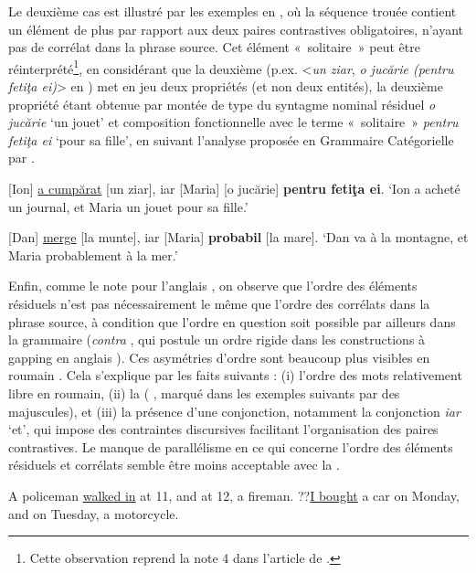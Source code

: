 Le deuxième cas est illustré par les exemples en , où la séquence trouée contient un élément de plus par rapport aux deux paires contrastives obligatoires, n’ayant pas de corrélat dans la phrase source. Cet élément «~solitaire~» peut être réinterprété\footnote{
 Cette observation reprend la note 4 dans l’article de \citet[186]{AbeilleEtAl2010}.}, en considérant que la deuxième  (p.ex. <\textit{un ziar}, \textit{o jucărie (pentru fetiţa ei)}> en ) met en jeu deux propriétés (et non deux entités), la deuxième propriété étant obtenue par montée de type du syntagme nominal résiduel \textit{o jucărie} ‘un jouet’ et composition fonctionnelle avec le terme «~solitaire~» \textit{pentru fetiţa ei} ‘pour sa fille’, en suivant l’analyse proposée en Grammaire Catégorielle par \citet{Steedman2000}. 

\ea \label{ch2:ex137}
\ea {} [Ion] \uline{a cumpărat} [un ziar], iar [Maria] [o jucărie] \textbf{pentru fetiţa ei}. \label{ch2:ex137a}
\glt  ‘Ion a acheté un journal, et Maria un jouet pour sa fille.’  

\ex {} [Dan] \uline{merge} [la munte], iar [Maria] \textbf{probabil} [la mare]. \label{ch2:ex137b} 
\glt  ‘Dan va à la montagne, et Maria probablement à la mer.’ 
\z
\z

Enfin, comme le note \citet{SagEtAl1985} pour l’anglais , on observe que l’ordre des éléments résiduels n’est pas nécessairement le même que l’ordre des corrélats dans la phrase source, à condition que l’ordre en question soit possible par ailleurs dans la grammaire (\textit{contra} \citealt{Johnson2014}, qui postule un ordre rigide dans les constructions à gapping en anglais ). Ces asymétries d’ordre sont beaucoup plus visibles en roumain . Cela s’explique par les faits suivants : (i) l’ordre des mots relativement libre en roumain, (ii) la  ({{\cad}} , marqué dans les exemples suivants par des majuscules), et (iii) la présence d’une conjonction, notamment la conjonction \textit{iar} ‘et’, qui impose des contraintes discursives facilitant l’organisation des paires contrastives. Le manque de parallélisme en ce qui concerne l’ordre des éléments résiduels et corrélats semble être moins acceptable avec la  .  

\ea
\ea A policeman \uline{walked in} at 11, and at 12, a fireman. \citep{SagEtAl1985} \label{ch2:ex138a} 
\ex ??\uline{I bought} a car on Monday, and on Tuesday, a motorcycle. \citep[25]{Johnson2014} \label{ch2:ex138b}
\z
\z

